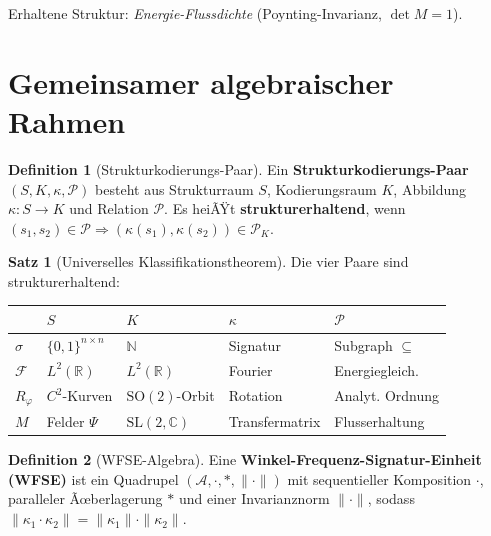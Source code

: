 ﻿\documentclass[a4paper,12pt]{scrreprt}
\theoremstyle{definition}
\newtheorem{definition}{Definition}[section]
\newtheorem{satz}{Satz}[section]
\begin{document}
Erhaltene Struktur: \emph{Energie-Flussdichte} (Poynting-Invarianz,
$\det M = 1$).

\section{Gemeinsamer algebraischer Rahmen}
\label{sec:nf1_rahmen}

\begin{definition}[Strukturkodierungs-Paar]
  Ein \textbf{Strukturkodierungs-Paar} $(S, K, \kappa, \mathcal{P})$
  besteht aus Strukturraum $S$, Kodierungsraum $K$,
  Abbildung $\kappa: S \to K$ und Relation $\mathcal{P}$.
  Es heiÃŸt \textbf{strukturerhaltend}, wenn
  $(s_1,s_2)\in\mathcal{P} \Rightarrow (\kappa(s_1),\kappa(s_2))\in\mathcal{P}_K$.
\end{definition}

\begin{satz}[Universelles Klassifikationstheorem]
  \label{satz:nf1_usk}
  Die vier Paare sind strukturerhaltend:

  \smallskip
  \begin{center}\small
  \begin{tabular}{lllll}
  \toprule
  & $S$ & $K$ & $\kappa$ & $\mathcal{P}$ \\
  \midrule
  $\sigma$ & $\{0,1\}^{n\times n}$ & $\mathbb{N}$ & Signatur & Subgraph $\subseteq$ \\
  $\mathcal{F}$ & $L^2(\mathbb{R})$ & $L^2(\mathbb{R})$ & Fourier & Energiegleich. \\
  $R_\varphi$ & $C^2$-Kurven & $\mathrm{SO}(2)$-Orbit & Rotation & Analyt. Ordnung \\
  $M$ & Felder $\Psi$ & $\mathrm{SL}(2,\mathbb{C})$ & Transfermatrix & Flusserhaltung \\
  \bottomrule
  \end{tabular}
  \end{center}
\end{satz}

\begin{definition}[WFSE-Algebra]
  Eine \textbf{Winkel-Frequenz-Signatur-Einheit (WFSE)} ist ein Quadrupel
  $(\mathcal{A}, \cdot, *, \|\cdot\|)$ mit sequentieller Komposition
  $\cdot$, paralleler Ãœberlagerung $*$ und einer Invarianznorm
  $\|\cdot\|$, sodass
  $\|\kappa_1 \cdot \kappa_2\| = \|\kappa_1\|\cdot\|\kappa_2\|$.
\end{definition}
\end{document}
